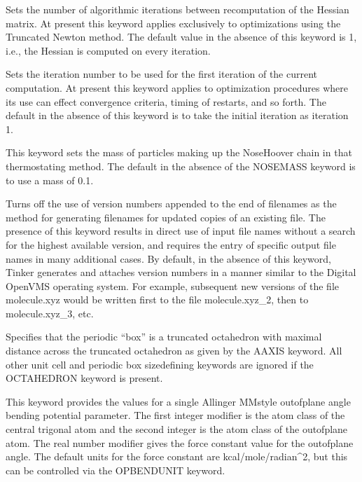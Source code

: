 \documentclass[letterpaper,11pt,english]{sphinxmanual}
\begin{document}
  Sets the number of algorithmic iterations between recomputation of the Hessian matrix. At present this keyword applies exclusively to optimizations using the Truncated Newton method. The default value in the absence of this keyword is 1, i.e., the Hessian is computed on every iteration.

  Sets the iteration number to be used for the first iteration of the current computation. At present this keyword applies to optimization procedures where its use can effect convergence criteria, timing of restarts, and so forth. The default in the absence of this keyword is to take the initial iteration as iteration 1.

  This keyword sets the mass of particles making up the Nose\sphinxhyphen{}Hoover chain in that thermostating method. The default in the absence of the NOSE\sphinxhyphen{}MASS keyword is to use a mass of 0.1.

  Turns off the use of version numbers appended to the end of filenames as the method for generating filenames for updated copies of an existing file. The presence of this keyword results in direct use of input file names without a search for the highest available version, and requires the entry of specific output file names in many additional cases. By default, in the absence of this keyword, Tinker generates and attaches version numbers in a manner similar to the Digital OpenVMS operating system. For example, subsequent new versions of the file molecule.xyz would be written first to the file molecule.xyz\_2, then to molecule.xyz\_3, etc.

  Specifies that the periodic “box” is a truncated octahedron with maximal distance across the truncated octahedron as given by the A\sphinxhyphen{}AXIS keyword. All other unit cell and periodic box size\sphinxhyphen{}defining keywords are ignored if the OCTAHEDRON keyword is present.

  This keyword provides the values for a single Allinger MM\sphinxhyphen{}style out\sphinxhyphen{}of\sphinxhyphen{}plane angle bending potential parameter. The first integer modifier is the atom class of the central trigonal atom and the second integer is the atom class of the out\sphinxhyphen{}of\sphinxhyphen{}plane atom. The real number modifier gives the force constant value for the out\sphinxhyphen{}of\sphinxhyphen{}plane angle. The default units for the force constant are kcal/mole/radian\textasciicircum{}2, but this can be controlled via the OPBENDUNIT keyword.
\end{document}
